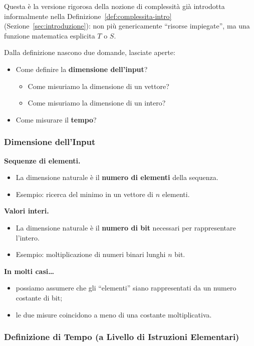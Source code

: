 \documentclass[12pt, a4paper]{article}
\begin{document}
Questa è la versione rigorosa della nozione di complessità già introdotta informalmente nella Definizione~\ref{def:complessita-intro} (Sezione~\ref{sec:introduzione}): non più genericamente ``risorse impiegate'', ma una funzione matematica esplicita $T$ o $S$.

Dalla definizione nascono due domande, lasciate aperte:
\begin{itemize}
    \item Come definire la \textbf{dimensione dell'input}?
    \begin{itemize}
        \item Come misuriamo la dimensione di un vettore?
        \item Come misuriamo la dimensione di un intero?
    \end{itemize}
    \item Come misurare il \textbf{tempo}?
\end{itemize}

\subsubsection{Dimensione dell'Input}

\textbf{Sequenze di elementi.}
\begin{itemize}
    \item La dimensione naturale è il \textbf{numero di elementi} della sequenza.
    \item Esempio: ricerca del minimo in un vettore di $n$ elementi.
\end{itemize}

\textbf{Valori interi.}
\begin{itemize}
    \item La dimensione naturale è il \textbf{numero di bit} necessari per rappresentare l'intero.
    \item Esempio: moltiplicazione di numeri binari lunghi $n$ bit.
\end{itemize}

\textbf{In molti casi\dots}
\begin{itemize}
    \item possiamo assumere che gli ``elementi'' siano rappresentati da un numero costante di bit;
    \item le due misure coincidono a meno di una costante moltiplicativa.
\end{itemize}

\subsubsection{Definizione di Tempo (a Livello di Istruzioni Elementari)}
\end{document}
